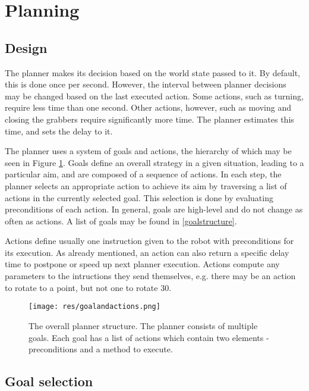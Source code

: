 \section{Planning}

\subsection{Design}

The planner makes its decision based on the world state passed to it. By
default, this is done once per second. However, the interval between planner
decisions may be changed based on the last executed action. Some actions, such
as turning, require less time than one second. Other actions, however, such as
moving and closing the grabbers require significantly more time. The planner
estimates this time, and sets the delay to it.

The planner uses a system of goals and actions, the hierarchy of which may be
seen in Figure \ref{fig:goalsandactionsstructure}. Goals define an overall
strategy in a given situation, leading to a particular aim, and are composed
of a sequence of actions. In each step, the planner selects an appropriate
action to achieve its aim by traversing a list of actions in the currently
selected goal. This selection is done by evaluating preconditions of each
action. In general, goals are high-level and do not change as often as actions.
A list of goals may be found in \cref{goalstructure}.

Actions define usually one instruction given to the robot with preconditions
for its execution. As already mentioned, an action can also return a specific
delay time to postpone or speed up next planner execution. Actions compute any
parameters to the intructions they send themselves, e.g. there may be an action
to rotate to a point, but not one to rotate 30\degree.

\begin{figure}[H]
	\begin{center}
    \texttt{[image: res/goalandactions.png]}
    \caption{The overall planner structure. The planner consists of multiple goals. Each goal has a list of actions which contain two elements - preconditions and a method to execute.}
    \label{fig:goalsandactionsstructure}
	\end{center}
\end{figure}

\subsection{Goal selection}

